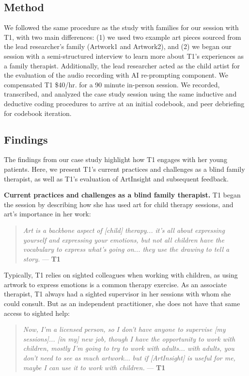 \documentclass[sigconf]{acmart}
\begin{document}
\subsection{Method} 
We followed the same procedure as the study with families for our session with T1, with two main differences: (1) we used two example art pieces sourced from the lead researcher's family (Artwork1 and Artwork2), and (2) we began our session with a semi-structured interview to learn more about T1's experiences as a family therapist. Additionally, the lead researcher acted as the child artist for the evaluation of the audio recording with AI re-prompting component. We compensated T1 \$40/hr. for a 90 minute in-person session. We recorded, transcribed, and analyzed the case study session using the same inductive and deductive coding procedures \cite{Braune_And_Clarke} to arrive at an initial codebook, and peer debriefing \cite{PeerDebriefing} for codebook iteration.

\subsection{Findings}
The findings from our case study highlight how T1 engages with her young patients. Here, we present T1's current practices and challenges as a blind family therapist, as well as T1's evaluation of ArtInsight and subsequent feedback.

\textbf{Current practices and challenges as a blind family therapist.}
T1 began the session by describing how she has used art for child therapy sessions, and art's importance in her work: 

\begin{quote}
    \textit{Art is a backbone aspect of [child] therapy... it's all about expressing yourself and expressing your emotions, but not all children have the vocabulary to express what's going on... they use the drawing to tell a story.}  --- \textbf{T1}
\end{quote}

Typically, T1 relies on sighted colleagues when working with children, as using artwork to express emotions is a common therapy exercise. As an associate therapist, T1 always had a sighted supervisor in her sessions with whom she could consult. But as an independent practitioner, she does not have that same access to sighted help:

\begin{quote}
    \textit{Now, I'm a licensed person, so I don't have anyone to supervise [my sessions]... [in my] new job, though I have the opportunity to work with children, mostly I'm going to try to work with adults... with adults, you don't need to see as much artwork... but if [ArtInsight] is useful for me, maybe I can use it to work with children.} --- \textbf{T1}
\end{quote}
\end{document}
